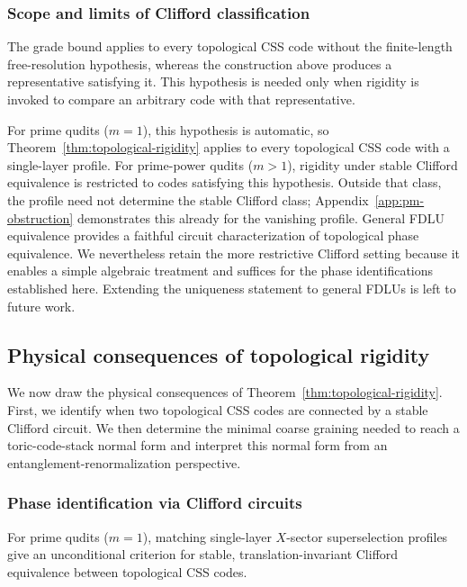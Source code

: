 \documentclass[aps,prx,english,superscriptaddress,twocolumn,tightenlines,showpacs,longbibliography,floatfix,amsfonts]{revtex4-2}
\theoremstyle{remark}
\theoremstyle{definition}
\begin{document}
\subsubsection{Scope and limits of Clifford classification}
\label{subsubsec:clifford-scope}
\label{rem:prime-power-rigidity-scope}

The grade bound applies to every topological CSS code without the
finite-length free-resolution hypothesis, whereas the construction above
produces a representative satisfying it. This hypothesis is needed only
when rigidity is invoked to compare an arbitrary code with that
representative.

For prime qudits (\(m=1\)), this hypothesis is automatic, so
Theorem~\ref{thm:topological-rigidity} applies to every topological CSS
code with a single-layer profile. For prime-power qudits (\(m>1\)),
rigidity under stable Clifford equivalence is restricted to codes
satisfying this hypothesis. Outside that class, the profile need not
determine the stable Clifford class;
Appendix~\ref{app:pm-obstruction} demonstrates this already for the
vanishing profile. General FDLU equivalence provides a faithful circuit
characterization of topological phase equivalence. We nevertheless retain
the more restrictive Clifford setting because it enables a simple algebraic
treatment and suffices for the phase identifications established here.
Extending the uniqueness statement to general FDLUs is left to future work.

\subsection{Physical consequences of topological rigidity}

We now draw the physical consequences of
Theorem~\ref{thm:topological-rigidity}. First, we identify when two
topological CSS codes are connected by a stable Clifford circuit. We then
determine the minimal coarse graining needed to reach a toric-code-stack
normal form and interpret this normal form from an
entanglement-renormalization perspective.

\subsubsection{Phase identification via Clifford circuits}

For prime qudits ($m=1$), matching single-layer \(X\)-sector
superselection profiles give an unconditional criterion for stable,
translation-invariant Clifford equivalence between topological CSS codes.
\end{document}
